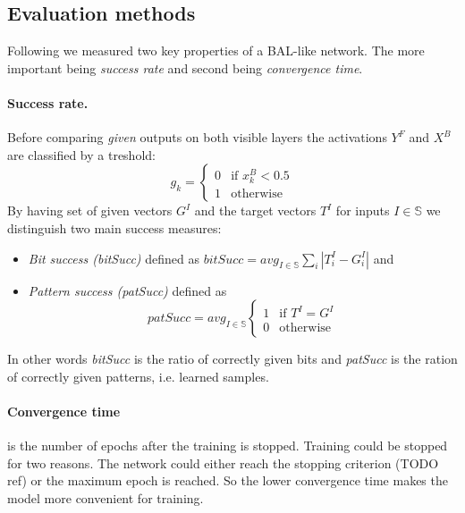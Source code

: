 
\subsection{Evaluation methods} 
\label{sec:sim-evaluation-methods} 

Following \citet{farkas2013bal} we measured two key properties of a BAL-like network. The more important being \emph{success rate} and second being \emph{convergence time}. 

\paragraph{Success rate.}  
Before comparing \emph{given} outputs on both visible layers the activations $Y^F$ and $X^B$ are classified by a treshold: 
\begin{equation} 
  g_k =
  \left\{
	  \begin{array}{ll}
		  0 & \mbox{if } x_k^B < 0.5 \\
		  1 & \mbox{otherwise}
	  \end{array}
  \right.  
\end{equation} 
By having set of given vectors $G^I$ and the target vectors $T^I$ for inputs $I \in \mathbb{S}$ we distinguish two main success measures: 
\begin{itemize}
  \item \emph{Bit success (bitSucc)} defined as $bitSucc = avg_{I \in \mathbb{S}} \sum_i |T_i^I - G^I_i|$ and 
  \item \emph{Pattern success (patSucc)} defined as 
    \begin{equation}
      patSucc = avg_{I \in \mathbb{S}} \left\{
	      \begin{array}{ll}
		      1 & \mbox{if } T^I = G^I \\
		      0 & \mbox{otherwise}
	      \end{array}
      \right.
    \end{equation} 
\end{itemize} 
In other words \emph{bitSucc} is the ratio of correctly given bits and \emph{patSucc} is the ration of correctly given patterns, i.e. learned samples. 

\paragraph{Convergence time} is the number of epochs after the training is stopped. Training could be stopped for two reasons. The network could either reach the stopping criterion (TODO ref) or the maximum epoch is reached. So the lower convergence time makes the model more convenient for training.  
